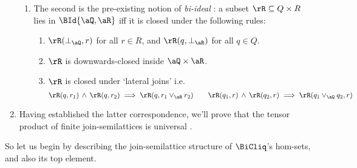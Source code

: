\documentclass{article}
\begin{document}
\begin{enumerate}
\begin{enumerate}
\item
The second is the pre-existing notion of \emph{bi-ideal} \cite{Fraser1978, GratzerTensorSemilattices2005}: a subset $\rR \subseteq Q \times R$ lies in $\BId{\aQ,\aR}$ iff it is closed under the following rules:
\begin{enumerate}
\item
$\rR(\bot_\aQ,r)$ for all $r \in R$, and $\rR(q,\bot_\aR)$ for all $q \in Q$.
\item
$\rR$ is downwards-closed inside $\aQ \times \aR$.
\item
$\rR$ is closed under `lateral joins' i.e.\ 
\[
\rR(q,r_1) \, \land \, \rR(q,r_2) \implies \rR(q,r_1 \lor_\aR r_2)
\qquad
\rR(q_1,r) \, \land \, \rR(q_2,r) \implies \rR(q_1 \lor_\aQ q_2,r)
\]
\end{enumerate}

\end{enumerate}

\item
Having established the latter correspondence, we'll prove that the tensor product of finite join-semilattices is universal \cite{Fraser1978}.

\end{enumerate}

\smallskip
So let us begin by describing the join-semilattice structure of $\BiCliq$'s hom-sets, and also its top element.
\end{document}
